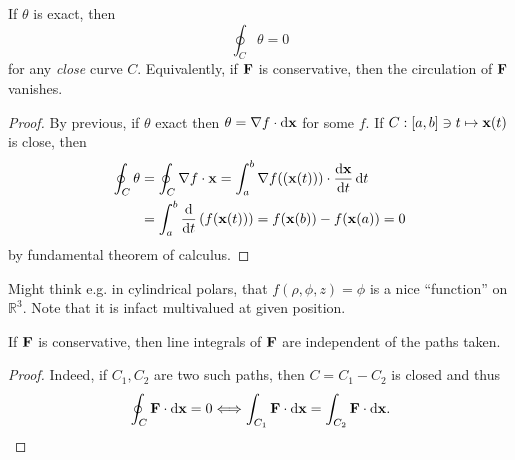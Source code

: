\begin{proposition}
    If $ \theta $ is exact, then 
    \[
        \oint_{C} \theta =0
    \]
    for any \textit{close} curve $C$. Equivalently, if ${\bf F}$ is conservative, then the circulation of ${\bf F}$ vanishes.
\end{proposition}
\begin{proof}
    By previous, if $ \theta $ exact then $ \theta=\nabla f \cdot \mathrm{d}{\bf x} $ for some $f$. If $ C: [a,b]\ni t \mapsto {\bf x}(t) $ is close, then 
    \begin{align*}
        \oint_{C}\theta &= \oint_{C}\nabla f\cdot {\bf x} = \int_{a}^{b} \nabla f(({\bf x}(t))) \cdot \frac{\mathrm{d}{\bf x}}{\mathrm{d}t}  \,\mathrm{d}t \\
       & = \int_{a}^{b} \frac{\mathrm{d}}{\mathrm{d}t}\left( f({\bf x}(t)) \right)  = f({\bf x}(b))-f({\bf x}(a)) = 0
    \end{align*}
    by fundamental theorem of calculus.
\end{proof}
\begin{note}
    Might think e.g. in cylindrical polars, that $f(\rho,\phi,z)=\phi$ is a nice ``function'' on $ \mathbb{R}^{3} $. Note that it is infact multivalued at given position.
\end{note}

\begin{corollary}
    If ${\bf F}$ is conservative, then line integrals of ${\bf F}$ are independent of the paths taken.
\end{corollary}
\begin{proof}
    Indeed, if $ C_1,C_2 $ are two such paths, then $ C=C_1-C_2 $ is closed and thus
    \[
        \oint_{C}{\bf F}\cdot\mathrm{d}{\bf x} = 0 \Longleftrightarrow \int_{C_1} {\bf F} \cdot\mathrm{d}\mathbf{x} = \int_{C_2} \mathbf{F} \cdot\mathrm{d}\mathbf{x}.
    \]
\end{proof}

